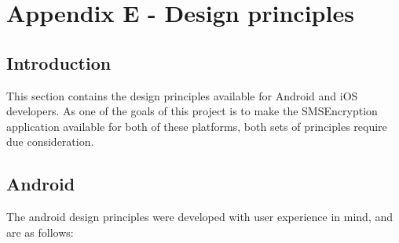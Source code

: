 \section{Appendix E - Design principles}

\subsection*{Introduction}
This section contains the design principles available for Android and iOS developers. As one of the goals of this project is to make the SMSEncryption application available for both of these platforms, both sets of principles require due consideration.
\subsection*{Android}
The android design principles were developed with user experience in mind, and are as follows:
